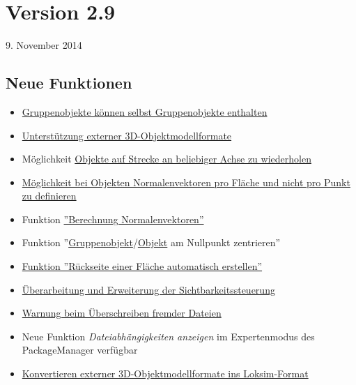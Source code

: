 \section{Version 2.9}\hfill 9. November 2014

\subsection{Neue Funktionen}
\begin{itemize}
\item \hyperref[sec:editor-obj-grp]{Gruppenobjekte können selbst Gruppenobjekte enthalten}
\item \hyperref[sec:editor-obj-externe]{Unterstützung externer 3D-Objektmodellformate}
\item Möglichkeit \hyperref[sec:editor-strecke-obj-achsewiederholung]{Objekte auf Strecke an beliebiger Achse zu wiederholen}
\item \hyperref[sec:editor-obj-l3dobj-normalen]{Möglichkeit bei Objekten Normalenvektoren pro Fläche und nicht pro Punkt zu definieren}
\item Funktion \hyperref[sec:editor-obj-l3dobj-normalen]{''Berechnung Normalenvektoren''}
\item Funktion ''\hyperref[sec:editor-obj-grp-verschieben]{Gruppenobjekt}/\hyperref[sec:editor-obj-l3dobj-punkteverschieben]{Objekt} am Nullpunkt zentrieren''
\item \hyperref[sec:editor-obj-l3dobj-flaeche]{Funktion ''Rückseite einer Fläche automatisch erstellen''}
\item \hyperref[sec:editor-obj-sichtbarkeitssteuerung]{Überarbeitung und Erweiterung der Sichtbarkeitssteuerung}
\item \hyperref[sec:editor-allg-dateienueberschreiben]{Warnung beim Überschreiben fremder Dateien}
\item Neue Funktion \emph{Dateiabhängigkeiten anzeigen} im Expertenmodus des PackageManager verfügbar
\item \hyperref[sec:editor-obj-externe-konvertieren]{Konvertieren externer 3D-Objektmodellformate ins Loksim-Format}
\end{itemize}

